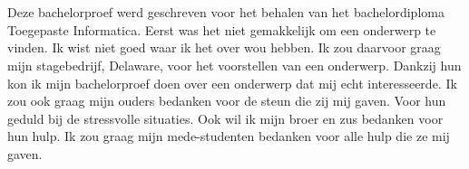 
\chapter*{}
\label{ch:voorwoord}

Deze bachelorproef werd geschreven voor het behalen van het bachelordiploma Toegepaste Informatica. Eerst was het niet gemakkelijk om een onderwerp te vinden. Ik wist niet goed waar ik het over wou hebben. Ik zou daarvoor graag mijn stagebedrijf, Delaware, voor het voorstellen van een onderwerp. Dankzij hun kon ik mijn bachelorproef doen over een onderwerp dat mij echt interesseerde.
Ik zou ook graag mijn ouders bedanken voor de steun die zij mij gaven. Voor hun geduld bij de stressvolle situaties. Ook wil ik mijn broer en zus bedanken voor hun hulp.
Ik zou graag mijn mede-studenten bedanken voor alle hulp die ze mij gaven. 

